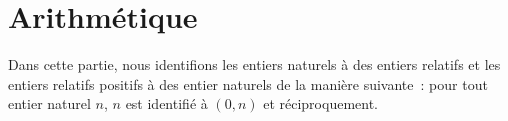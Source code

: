 \section{Arithmétique}
\label{sec:arithmetique}

\localtoc

Dans cette partie, nous identifions les entiers naturels à des entiers relatifs et les entiers relatifs positifs à des entier naturels de la manière suivante : pour tout entier naturel $n$, $n$ est identifié à $(0,n)$ et réciproquement.










